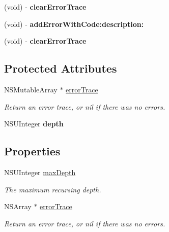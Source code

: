 \begin{DoxyCompactItemize}
\item 
\hypertarget{interface_s_b_json_base_a6a429d6db2149fea7435b9e0aac5d3fa}{
(void) -\/ {\bfseries clear\-Error\-Trace}}
\label{interface_s_b_json_base_a6a429d6db2149fea7435b9e0aac5d3fa}

\item 
\hypertarget{interface_s_b_json_base_af6fc685c386c1c4528bd30b2bd630d56}{
(void) -\/ {\bfseries add\-Error\-With\-Code\-:description\-:}}
\label{interface_s_b_json_base_af6fc685c386c1c4528bd30b2bd630d56}

\item 
\hypertarget{interface_s_b_json_base_a6a429d6db2149fea7435b9e0aac5d3fa}{
(void) -\/ {\bfseries clear\-Error\-Trace}}
\label{interface_s_b_json_base_a6a429d6db2149fea7435b9e0aac5d3fa}

\end{DoxyCompactItemize}
\subsection*{\-Protected \-Attributes}
\begin{DoxyCompactItemize}
\item 
\-N\-S\-Mutable\-Array $\ast$ \hyperlink{interface_s_b_json_base_a38a6b6f8e196d417ea38ee82274e30bb}{error\-Trace}
\begin{DoxyCompactList}\small\item\em \-Return an error trace, or nil if there was no errors. \end{DoxyCompactList}\item 
\hypertarget{interface_s_b_json_base_a5e80155581d240f565ec4149ad812e03}{
\-N\-S\-U\-Integer {\bfseries depth}}
\label{interface_s_b_json_base_a5e80155581d240f565ec4149ad812e03}

\end{DoxyCompactItemize}
\subsection*{\-Properties}
\begin{DoxyCompactItemize}
\item 
\-N\-S\-U\-Integer \hyperlink{interface_s_b_json_base_abe3e47517711570a9a57e2d92a15055b}{max\-Depth}
\begin{DoxyCompactList}\small\item\em \-The maximum recursing depth. \end{DoxyCompactList}\item 
\-N\-S\-Array $\ast$ \hyperlink{interface_s_b_json_base_aa83f0ee5efade2fd26ddf6591ffd8dc0}{error\-Trace}
\begin{DoxyCompactList}\small\item\em \-Return an error trace, or nil if there was no errors. \end{DoxyCompactList}\end{DoxyCompactItemize}


